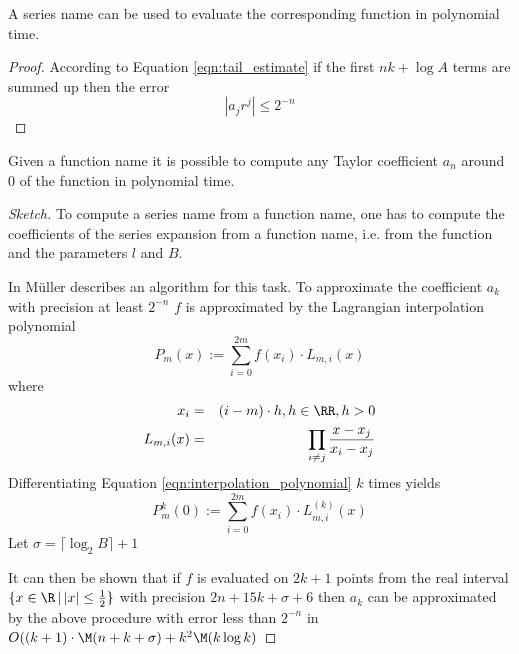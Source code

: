    \begin{theorem}
     A series name can be used to evaluate the corresponding function in polynomial time.
     \begin{proof}
       According to Equation \ref{eqn:tail_estimate} if the first $nk+\log A$ terms are summed up then the error 
       $$ \left | a_j r^j \right | \leq 2^{-n} $$
     \end{proof}
   \end{theorem}

   \begin{theorem}
    Given a function name it is possible to compute any Taylor coefficient $a_n$ around $0$ of the function
    in polynomial time.
    
	 \begin{proof}[Sketch]
	 	To compute a series name from a function name, one has to compute the coefficients of the series 
    expansion from a function name, i.e. from the function and the parameters $l$ and $B$.

	 	In \cite{Mue} M\"uller describes an algorithm for this task.
	 	To approximate the coefficient $a_k$ with precision at least $2^{-n}$ $f$ is approximated by the Lagrangian interpolation
	 	polynomial
	 	\begin{equation}\label{eqn:interpolation_polynomial}
	 		P_m(x)  :=  \sum_{i=0}^{2m} f(x_i) \cdot L_{m,i}(x) 
	 	\end{equation}
	 	where
	 	\begin{eqnarray*}
	 		x_i & = & (i-m) \cdot h , h \in \RR, h > 0 \\
	 		L_{m,i}(x) & = & \prod_{i \neq j} \frac{x-x_j}{x_i-x_j} 
	 	\end{eqnarray*}
	 	Differentiating Equation \ref{eqn:interpolation_polynomial} $k$ times yields
	 	\begin{equation}\label{eqn:interpolation_polynomial_diff}
	 		P_m^k(0)  :=  \sum_{i=0}^{2m} f(x_i) \cdot L_{m,i}^{(k)}(x) 
	 	\end{equation}
	 	Let $\sigma = \lceil \log_2 B \rceil + 1$

	 	It can then be shown that if $f$ is evaluated on $2k+1$ points from the 
	 	real interval $\{x \in \R \,|\, |x| \leq \frac{1}{2}\}$ with precision $2n+15k+\sigma+6$ 
	 	then $a_k$ can be approximated by the above procedure with error less than $2^{-n}$ in 
	 	$O((k+1)\cdot \M(n+k+\sigma) + k^2 \M (k \log k)$

	 \end{proof}
   \end{theorem}

